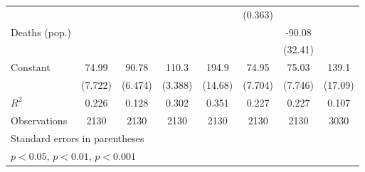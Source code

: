 \documentclass{article}
\begin{document}
{\begin{longtable}{l*{7}{c}}
                &                  &                  &                  &                  &  (0.363)         &                  &                  \\
Deaths (pop.)   &                  &                  &                  &                  &                  &   -90.08\sym{*}  &                  \\
                &                  &                  &                  &                  &                  &  (32.41)         &                  \\
Constant        &    74.99\sym{***}&    90.78\sym{***}&    110.3\sym{***}&    194.9\sym{***}&    74.95\sym{***}&    75.03\sym{***}&    139.1\sym{***}\\
                &  (7.722)         &  (6.474)         &  (3.388)         &  (14.68)         &  (7.704)         &  (7.746)         &  (17.09)         \\
\hline
\(R^{2}\)       &    0.226         &    0.128         &    0.302         &    0.351         &    0.227         &    0.227         &    0.107         \\
Observations    &     2130         &     2130         &     2130         &     2130         &     2130         &     2130         &     3030         \\
\hline\hline
\multicolumn{8}{l}{\footnotesize Standard errors in parentheses}\\
\multicolumn{8}{l}{\footnotesize \sym{*} \(p<0.05\), \sym{**} \(p<0.01\), \sym{***} \(p<0.001\)}\\
\end{longtable}
}
\end{document}
